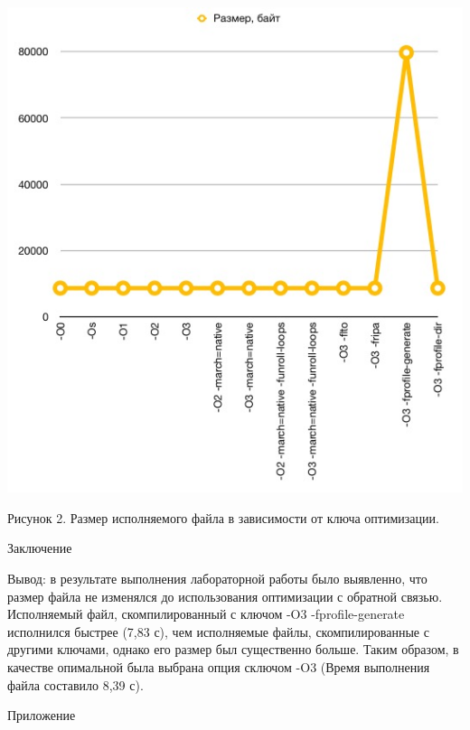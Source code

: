 \documentclass[12pt,a4paper]{scrartcl}
\begin{document}
\begin{center}
\includegraphics[width=\linewidth]{size.jpg}
\caption{Рисунок 2. Размер исполняемого файла в зависимости от ключа оптимизации.}
\end{center}
\par
\newpage
\begin{center}
    {\LARGE Заключение}
\end{center}
\par
Вывод: в результате выполнения лабораторной работы было выявленно, что размер файла не изменялся до использования оптимизации с обратной связью. Исполняемый файл, скомпилированный с ключом -O3 -fprofile-generate исполнился быстрее (7,83 с), чем исполняемые файлы, скомпилированные с другими ключами, однако его размер был существенно больше. Таким образом, в качестве опимальной была выбрана опция сключом -O3 (Время выполнения файла составило 8,39 с).
\newpage
\begin{center}
    {\LARGE Приложение}
\end{center}
\end{document}
